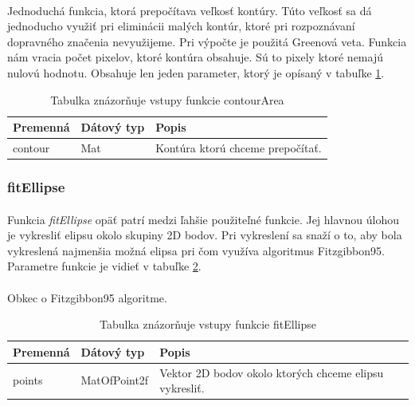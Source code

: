 \documentclass[12pt]{article}
\begin{document}
\paragraph{}
Jednoduchá funkcia, ktorá prepočítava veľkosť kontúry.
Túto veľkosť sa dá jednoducho využiť pri eliminácii malých kontúr, ktoré pri rozpoznávaní dopravného značenia nevyužijeme.
Pri výpočte je použitá Greenová veta. Funkcia nám vracia počet pixelov, ktoré kontúra obsahuje. Sú to pixely ktoré nemajú nulovú hodnotu.
Obsahuje len jeden parameter, ktorý je opísaný v tabuľke \ref{contourAreaPar}.
\cite{contourarea_doc}
\cite{OpenCVDoc}
\begin{table}
	\centering
    \begin{tabular}{ | l | l | p{5cm} |}
    \hline
    Premenná & Dátový typ & Popis \\ \hline
    contour & Mat & Kontúra ktorú chceme prepočítať. \\ 
    \hline
    \end{tabular}
  	\caption{Tabulka znázorňuje vstupy funkcie contourArea}
  	\label{contourAreaPar}
\end{table}
\subsubsection{fitEllipse}
\paragraph{}
Funkcia \emph{fitEllipse} opäť patrí medzi ľahšie použiteľné funkcie. Jej hlavnou úlohou je vykresliť elipsu okolo skupiny 2D bodov.
Pri vykreslení sa snaží o to, aby bola vykreslená najmenšia možná elipsa pri čom využíva algoritmus Fitzgibbon95.
Parametre funkcie je vidieť v tabuľke \ref{fitEllipsePar}.
\paragraph{}
Obkec o Fitzgibbon95 algoritme.
\cite{fitellipse_doc}
\cite{OpenCVDoc}
\begin{table}
	\centering
    \begin{tabular}{ | l | l | p{5cm} |}
    \hline
    Premenná & Dátový typ & Popis \\ \hline
    points & MatOfPoint2f & Vektor 2D bodov okolo ktorých chceme elipsu vykresliť. \\ 
    \hline
    \end{tabular}
  	\caption{Tabulka znázorňuje vstupy funkcie fitEllipse}
  	\label{fitEllipsePar}
\end{table}
\end{document}
